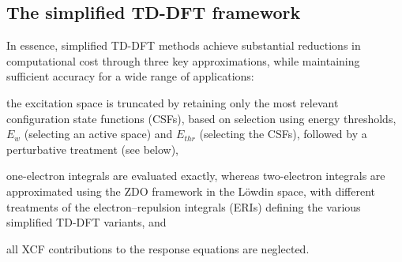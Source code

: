 \documentclass[%
 aip,
 amsmath,amssymb,
preprint,%
]{revtex4-2}
\begin{document}
\subsection{The simplified TD-DFT framework}

In essence, simplified TD-DFT methods achieve substantial reductions in computational cost through three key approximations, while maintaining sufficient accuracy for a wide range of applications: 
\begin{inparaenum}[(i)]
	\item the excitation space is truncated by retaining only the most relevant configuration state functions (CSFs), based on selection using energy thresholds, $E_w$ (selecting an active space) and $E_{thr}$ (selecting the CSFs), followed by a perturbative treatment (see below),
	\item one-electron integrals are evaluated exactly, whereas two-electron integrals are approximated using the ZDO framework in the Löwdin space, with different treatments of the electron--repulsion integrals (ERIs) defining the various simplified TD-DFT variants, and
	\item all XCF contributions to the response equations are neglected.
\end{inparaenum}
\end{document}
